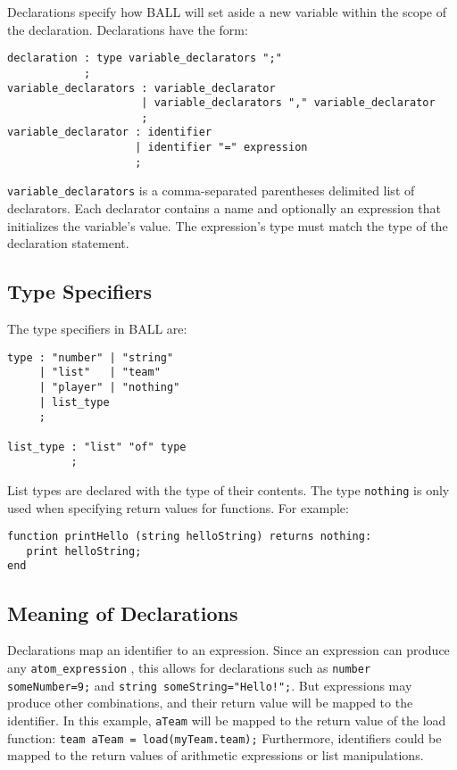 Declarations specify how BALL will set aside a new variable within the
scope of the declaration. Declarations have the form:

\begin{verbatim}
declaration : type variable_declarators ";"
            ;
variable_declarators : variable_declarator
                     | variable_declarators "," variable_declarator
                     ;
variable_declarator : identifier
                    | identifier "=" expression
                    ;
\end{verbatim}

\texttt{variable\_declarators} is a comma-separated parentheses
delimited list of declarators. Each declarator contains a name and
optionally an expression that initializes the variable's value. The
expression's type must match the type of the declaration statement.

\subsection{Type Specifiers}

The type specifiers in BALL are: 

\begin{verbatim}
type : "number" | "string"
     | "list"   | "team"
     | "player" | "nothing"
     | list_type
     ;

list_type : "list" "of" type
          ;
\end{verbatim}

List types are declared with the type of their contents.  The type
\texttt{nothing} is only used when specifying return values for
functions. For example:

\begin{verbatim}
function printHello (string helloString) returns nothing:
   print helloString;
end
\end{verbatim}

\subsection{Meaning of Declarations}

Declarations map an identifier to an expression. Since an expression
can produce any \texttt{atom\_expression} , this allows for
declarations such as \texttt{number someNumber=9;} and \texttt{string
  someString="Hello!";}. But expressions may produce other
combinations, and their return value will be mapped to the
identifier. In this example, \texttt{aTeam} will be mapped to the
return value of the load function: \texttt{team aTeam =
  load(myTeam.team);} Furthermore, identifiers could be mapped to the
return values of arithmetic expressions or list manipulations.

